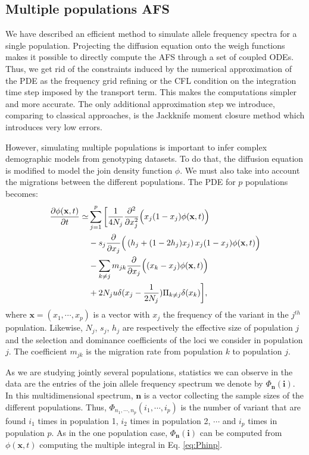 \subsection{Multiple populations AFS}
We have described an efficient method to simulate allele frequency spectra for a single population. Projecting the diffusion equation onto the weigh functions makes it possible to directly compute the AFS through a set of coupled ODEs. Thus, we get rid of the constraints induced by the numerical approximation of the PDE as the frequency grid refining or the CFL condition on the integration time step imposed by the transport term. This makes the computations simpler and more accurate. The only additional approximation step we introduce, comparing to classical approaches, is the Jackknife moment closure method which introduces very low errors.

However, simulating multiple populations is important to infer complex demographic models from genotyping datasets. To do that, the diffusion equation is modified to model the join density function $\phi$. We must also take into account the migrations between the different populations. The PDE for $p$ populations becomes: 
 \begin{equation}
\begin{split}
\frac{\partial \phi(\textbf{x},t)}{\partial t}\simeq & \sum_{j=1}^p \bigg[ \frac{1}{4 N_j} \frac{\partial^2 }{\partial x_j^2} \Big( x_j(1-x_j) \phi(\textbf{x},t)\Big) \\
					&-s_j \frac{\partial }{\partial x_j}\Big( \left(h_j+(1-2h_j)x_j \right)x_j (1-x_j) \phi(\textbf{x},t)\Big) \\
					&-\sum_{k \neq j}m_{jk}\frac{\partial }{\partial x_j}\Big( (x_k-x_j) \phi(\textbf{x},t)\Big)\\
					&+ 2 N_j u \delta(x_j-\frac{1}{2 N_j})\Pi_{k\neq j}\delta(x_k)\bigg],
\end{split}
\label{eq:diffnp}
\end{equation}
where $\textbf{x} = (x_1, \cdots, x_p)$ is a vector with $x_j$ the frequency of the variant in the $j^{th}$ population. Likewise, $N_j$, $s_j$, $h_j$ are respectively the effective size of population $j$ and the selection and dominance coefficients of the loci we consider in population $j$. The coefficient $m_{jk}$ is the migration rate from population $k$ to population $j$.

As we are studying jointly several populations, statistics we can observe in the data are the entries of the join allele frequency spectrum we denote by $\Phi_\textbf{n}(\textbf{i})$. In this multidimensional spectrum, $\textbf{n}$ is a vector collecting the sample sizes of the different populations. Thus, $\Phi_{n_1, \cdots, n_p}(i_1, \cdots, i_p)$ is the number of variant that are found $i_1$ times in population 1, $i_2$ times in population 2, $\cdots$ and $i_p$ times in population $p$. As in the one population case, $\Phi_\textbf{n}(\textbf{i})$ can be computed from $\phi(\textbf{x},t)$ computing the multiple integral in Eq. \eqref{eq:Phinp}.

